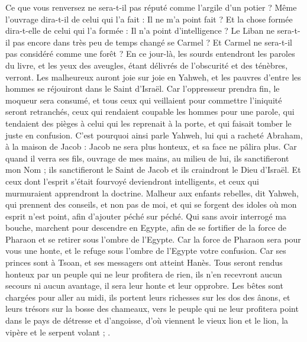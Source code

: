 \begin{multicols}{2}
Ce que vous renversez ne sera-t-il pas réputé comme l'argile d'un potier ? Même l'ouvrage dira-t-il de celui qui l'a fait : Il ne m'a point fait ? Et la chose formée dira-t-elle de celui qui l'a formée : Il n'a point d'intelligence ?
Le Liban ne sera-t-il pas encore dans très peu de temps changé se Carmel ? Et Carmel ne sera-t-il pas considéré comme une forêt ?
En ce jour-là, les sourds entendront les paroles du livre, et les yeux des aveugles, étant délivrés de l'obscurité et des ténèbres, verront.
Les malheureux auront joie sur joie en Yahweh, et les pauvres d'entre les hommes se réjouiront dans le Saint d'Israël.
Car l'oppresseur prendra fin, le moqueur sera consumé, et tous ceux qui veillaient pour commettre l'iniquité seront retranchés,
ceux qui rendaient coupable les hommes pour une parole, qui tendaient des pièges à celui qui les reprenait à la porte, et qui faisait tomber le juste en confusion. 
C'est pourquoi ainsi parle Yahweh, lui qui a racheté Abraham, à la maison de Jacob : Jacob ne sera plus honteux, et sa face ne pâlira plus.
Car quand il verra ses fils, ouvrage de mes mains, au milieu de lui, ils sanctifieront mon Nom ; ils sanctifieront le Saint de Jacob et ils craindront le Dieu d'Israël.
Et ceux dont l'esprit s'était fourvoyé deviendront intelligents, et ceux qui murmuraient apprendront la doctrine.
\VerseOne{}Malheur aux enfants rebelles, dit Yahweh, qui prennent des conseils, et non pas de moi, et qui se forgent des idoles où mon esprit n'est point, afin d'ajouter péché sur péché.
Qui sans avoir interrogé ma bouche, marchent pour descendre en Egypte, afin de se fortifier de la force de Pharaon et se retirer sous l'ombre de l'Egypte.
Car la force de Pharaon sera pour vous une honte, et le refuge sous l'ombre de l'Egypte votre confusion.
Car ses princes sont à Tsoan, et ses messagers ont atteint Hanès.
Tous seront rendus honteux par un peuple qui ne leur profitera de rien, ils n'en recevront aucun secours ni aucun avantage, il sera leur honte et leur opprobre.
Les bêtes sont chargées pour aller au midi, ils portent leurs richesses sur les dos des ânons, et leurs trésors sur la bosse des chameaux, vers le peuple qui ne leur profitera point dans le pays de détresse et d'angoisse, d'où viennent le vieux lion et le lion, la vipère et le serpent volant ; .

\end{multicols}
